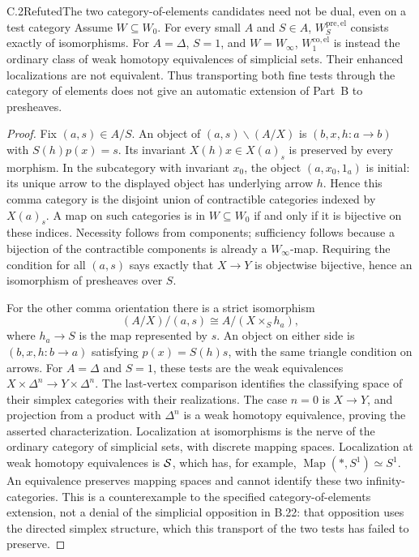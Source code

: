 \begin{claim}{C.2}{Refuted}{The two category-of-elements candidates need not be dual, even on a test category}
Assume $W\subseteq W_0$. For every small $A$ and $S\in\widehat A$,
$W^{\mathrm{pre,el}}_S$ consists exactly of isomorphisms.
For $A=\Delta$, $S=1$, and $W=W_\infty$,
$W^{\mathrm{co,el}}_1$ is instead the ordinary class of weak homotopy
equivalences of simplicial sets. Their enhanced localizations are not
equivalent. Thus transporting both fine tests through the category of
elements does not give an automatic extension of Part~B to presheaves.
\end{claim}
\begin{proof}
Fix $(a,s)\in A/S$. An object of $(a,s)\backslash(A/X)$ is
$(b,x,h:a\to b)$ with $S(h)p(x)=s$. Its invariant
$X(h)x\in X(a)_s$ is preserved by every morphism. In the subcategory
with invariant $x_0$, the object $(a,x_0,1_a)$ is initial: its unique
arrow to the displayed object has underlying arrow $h$. Hence this comma
category is the disjoint union of contractible categories indexed by
$X(a)_s$. A map on such categories is in $W\subseteq W_0$ if and only
if it is bijective on these indices. Necessity follows from components;
sufficiency follows because a bijection of the contractible components
is already a $W_\infty$-map. Requiring the condition for all $(a,s)$
says exactly that $X\to Y$ is objectwise bijective, hence an isomorphism
of presheaves over $S$.

For the other comma orientation there is a strict isomorphism
\[
 (A/X)/(a,s)\cong A/(X\times_S h_a),
\]
where $h_a\to S$ is the map represented by $s$. An object on either side
is $(b,x,h:b\to a)$ satisfying $p(x)=S(h)s$, with the same triangle
condition on arrows. For $A=\Delta$ and $S=1$, these tests are the
weak equivalences $X\times\Delta^n\to Y\times\Delta^n$.
The last-vertex comparison identifies the classifying space of their
simplex categories with their realizations. The case $n=0$ is $X\to Y$,
and projection from a product with $\Delta^n$ is a weak homotopy
equivalence, proving the asserted characterization.
Localization at isomorphisms is the nerve of the ordinary category of
simplicial sets, with discrete mapping spaces. Localization at weak
homotopy equivalences is $\mathcal S$, which has, for example,
$\operatorname{Map}(*,S^1)\simeq S^1$. An equivalence preserves mapping
spaces and cannot identify these two infinity-categories.
This is a counterexample to the specified category-of-elements extension,
not a denial of the simplicial opposition in B.22: that opposition uses
the directed simplex structure, which this transport of the two tests
has failed to preserve.
\end{proof}

